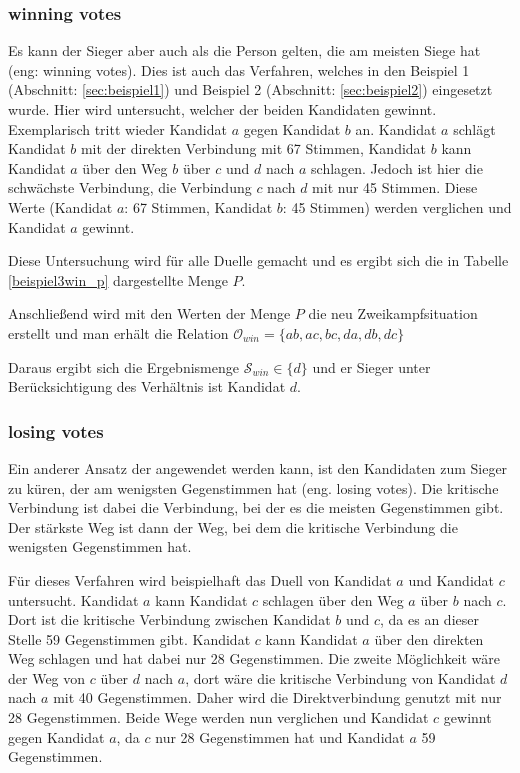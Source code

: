 \subsubsection{winning votes}
\label{sec:winningVotes}
Es kann der Sieger aber auch als die Person gelten, die am meisten Siege hat (eng: winning votes). Dies ist auch das Verfahren, welches in den Beispiel 1 (Abschnitt: \ref{sec:beispiel1}) und Beispiel 2 (Abschnitt: \ref{sec:beispiel2}) eingesetzt wurde. Hier wird untersucht, welcher der beiden Kandidaten gewinnt. Exemplarisch tritt wieder Kandidat $a$ gegen Kandidat $b$ an. Kandidat $a$ schlägt Kandidat $b$ mit der direkten Verbindung mit 67 Stimmen, Kandidat $b$ kann Kandidat $a$ über den Weg $b$ über $c$ und $d$ nach $a$ schlagen. Jedoch ist hier die schwächste Verbindung, die Verbindung $c$ nach $d$ mit nur 45 Stimmen. Diese Werte (Kandidat $a$: 67 Stimmen, Kandidat $b$: 45 Stimmen) werden verglichen und Kandidat $a$ gewinnt. 

Diese Untersuchung wird für alle Duelle gemacht und es ergibt sich die in Tabelle \ref{beispiel3win_p} dargestellte Menge $P$.




Anschließend wird mit den Werten der Menge $P$ die neu Zweikampfsituation erstellt und man erhält die Relation $\mathcal{O}_{win} = \{ ab,ac,bc,da,db,dc \}$

Daraus ergibt sich die Ergebnismenge $\mathcal{S}_{win} \in \{d\}$ und er Sieger unter Berücksichtigung des Verhältnis ist Kandidat $d$.


\subsubsection{losing votes}
\label{sec:lose}
Ein anderer Ansatz der angewendet werden kann, ist den Kandidaten zum Sieger zu küren, der am wenigsten Gegenstimmen hat (eng. losing votes). Die kritische Verbindung ist dabei die Verbindung, bei der es die meisten Gegenstimmen gibt. Der stärkste Weg ist dann der Weg, bei dem die kritische Verbindung die wenigsten Gegenstimmen hat.

Für dieses Verfahren wird beispielhaft das Duell von Kandidat $a$ und Kandidat $c$ untersucht. Kandidat $a$ kann Kandidat $c$ schlagen über den Weg $a$ über $b$ nach $c$. Dort ist die kritische Verbindung zwischen Kandidat $b$ und $c$, da es an dieser Stelle 59 Gegenstimmen gibt. 
Kandidat $c$ kann Kandidat $a$ über den direkten Weg schlagen und hat dabei nur 28 Gegenstimmen. Die zweite Möglichkeit wäre der Weg von $c$ über $d$ nach $a$, dort wäre die kritische Verbindung von Kandidat $d$ nach $a$ mit 40 Gegenstimmen. Daher wird die Direktverbindung genutzt mit nur 28 Gegenstimmen.
Beide Wege werden nun verglichen und Kandidat $c$ gewinnt gegen Kandidat $a$, da $c$ nur 28 Gegenstimmen hat und Kandidat $a$ 59 Gegenstimmen.

